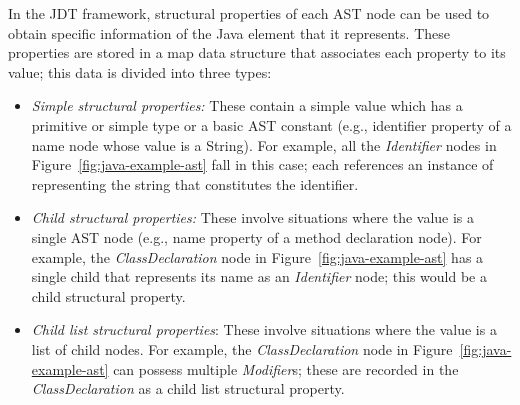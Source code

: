 In the JDT framework, structural properties of each AST node can be used to obtain specific information of the Java element that it represents. These properties are stored in a map data structure that associates each property to its value; this data is divided into three types:
\begin{itemize} [leftmargin=0.7in]
\item \textit{Simple structural properties:} These contain a simple value which has a primitive or simple type or a basic AST constant (e.g., identifier property of a name node whose value is a String).  For example, all the \textit{Identifier} nodes in Figure~\ref{fig:java-example-ast} fall in this case; each references an instance of  representing the string that constitutes the identifier.
\item \textit{Child structural properties:} These involve situations where the value is a single AST node (e.g., name property of a method declaration node).  For example, the \textit{ClassDeclaration} node in Figure~\ref{fig:java-example-ast} has a single child that represents its name as an \textit{Identifier} node; this would be a child structural property.
\item \textit{Child list structural properties}: These involve situations where the value is a list of child nodes.  For example, the \textit{ClassDeclaration} node in Figure~\ref{fig:java-example-ast} can possess multiple \textit{Modifier}s; these are recorded in the \textit{ClassDeclaration} as a child list structural property.
\end{itemize}


